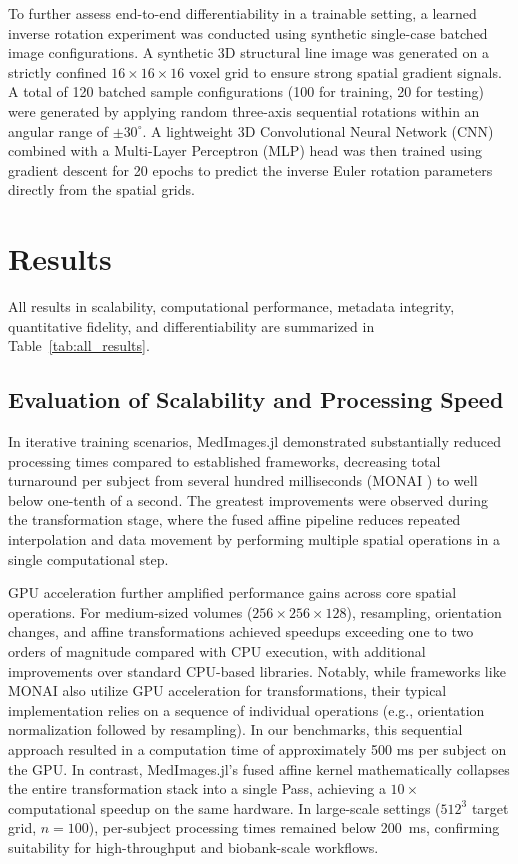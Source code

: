 \documentclass[a4paper,10pt]{elsarticle}
\begin{document}
To further assess end-to-end differentiability in a trainable setting, a learned inverse rotation experiment was conducted using synthetic single-case batched image configurations. A synthetic 3D structural line image was generated on a strictly confined $16 \times 16 \times 16$ voxel grid to ensure strong spatial gradient signals. A total of 120 batched sample configurations (100 for training, 20 for testing) were generated by applying random three-axis sequential rotations within an angular range of $\pm 30^{\circ}$. A lightweight 3D Convolutional Neural Network (CNN) combined with a Multi-Layer Perceptron (MLP) head was then trained using gradient descent for 20 epochs to predict the inverse Euler rotation parameters directly from the spatial grids.

\section{Results }

All results in scalability, computational performance, metadata integrity, quantitative fidelity, and differentiability are summarized in Table~\ref{tab:all_results}.

\subsection*{Evaluation of Scalability and Processing Speed}
In iterative training scenarios, MedImages.jl demonstrated substantially reduced processing times compared to established frameworks, decreasing total turnaround per subject from several hundred milliseconds (MONAI  \cite{KraljevicSearle2021}) to well below one-tenth of a second. The greatest improvements were observed during the transformation stage, where the fused affine pipeline reduces repeated interpolation and data movement by performing multiple spatial operations in a single computational step. 

GPU acceleration further amplified performance gains across core spatial operations. For medium-sized volumes ($256 \times 256 \times 128$), resampling, orientation changes, and affine transformations achieved speedups exceeding one to two orders of magnitude compared with CPU execution, with additional improvements over standard CPU-based libraries. Notably, while frameworks like MONAI also utilize GPU acceleration for transformations, their typical implementation relies on a sequence of individual operations (e.g., orientation normalization followed by resampling). In our benchmarks, this sequential approach resulted in a computation time of approximately 500 ms per subject on the GPU. In contrast, MedImages.jl's fused affine kernel mathematically collapses the entire transformation stack into a single Pass, achieving a $10\times$ computational speedup on the same hardware. In large-scale settings ($512^3$ target grid, $n=100$), per-subject processing times remained below 200~ms, confirming suitability for high-throughput and biobank-scale workflows.
\end{document}
